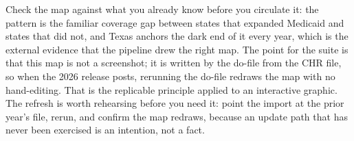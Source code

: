\documentclass[
    a4paper,
    fontsize=10pt,
    twoside=true,
    numbers=noenddot,
]{kaobook}
\begin{document}
Check the map against what you already know before you circulate it: the pattern is the familiar coverage gap between states that expanded Medicaid and states that did not, and Texas anchors the dark end of it every year, which is the external evidence that the pipeline drew the right map. The point for the suite is that this map is not a screenshot; it is written by the do-file from the CHR file, so when the 2026 release posts, rerunning the do-file redraws the map with no hand-editing. That is the replicable principle applied to an interactive graphic. The refresh is worth rehearsing before you need it: point the import at the prior year's file, rerun, and confirm the map redraws, because an update path that has never been exercised is an intention, not a fact.
\end{document}
